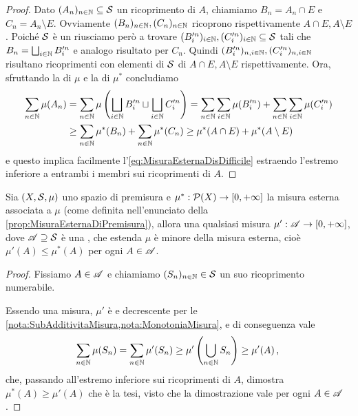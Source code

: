 \begin{proof}
	Dato $(A_n)_{n\in\N}\subseteq\S$ un ricoprimento di $A$, chiamiamo $B_n=A_n\cap E$ e $C_n=A_n\setminus E$. Ovviamente $(B_n)_{n\in\N},(C_n)_{n\in\N}$ ricoprono rispettivamente $A\cap E,A\setminus E$. Poiché $\S$ è un \semiring{} riusciamo però a trovare $(B'^n_i)_{i\in\N},(C'^n_i)_{i\in\N} \subseteq \S$ tali che $B_n=\bigsqcup_{i\in\N}B'^n_i$ e analogo risultato per $C_n$. Quindi $(B'^n_i)_{n,i\in\N}, (C'^n_i)_{n,i\in\N}$ risultano ricoprimenti con elementi di $\S$ di $A\cap E,A\setminus E$ rispettivamente.
	Ora, sfruttando la \sigadd[ità] di $\mu$ e la \sigsubadd[ità] di $\mu^*$ concludiamo
	\begin{align*}
		\sum_{n\in\N}\mu(A_n)&=
		\sum_{n\in\N} \mu\left(\bigsqcup_{i\in\N} B'^n_i\sqcup \bigsqcup_{i\in\N} C'^n_i\right)=
		\sum_{n\in\N}\sum_{i\in\N}\mu(B'^n_i)+\sum_{n\in\N}\sum_{i\in\N}\mu(C'^n_i)\\
		&\ge
		\sum_{n\in\N}\mu^*(B_n)+\sum_{n\in\N}\mu^*(C_n)
		\ge \mu^*(A\cap E)+\mu^*(A\setminus E)
	\end{align*}
	e questo implica facilmente l'\cref{eq:MisuraEsternaDisDifficile} estraendo l'estremo inferiore a entrambi i membri sui ricoprimenti di $A$.
\end{proof}
\begin{remark}\label{nota:PremisuraMassimaMisura}
	Sia $(X,\S,\mu)$ uno spazio di premisura e $\mu^*:\mathcal P(X)\to\Rpiu$ la misura esterna associata a $\mu$ (come definita nell'enunciato della \cref{prop:MisuraEsternaDiPremisura}), allora una qualsiasi misura $\mu':\A\to\Rpiu$, dove $\A\supseteq \S$ è una \sigalg{}, che estenda $\mu$ è minore della misura esterna, cioè $\mu'(A)\le \mu^*(A)$ per ogni $A\in\A$.
\end{remark}
\begin{proof}
	Fissiamo $A\in\A$ e chiamiamo $(S_n)_{n\in\N}\in\S$ un suo ricoprimento numerabile.
	
	Essendo una misura, $\mu'$ è \sigsubadd{} e decrescente per le \cref{nota:SubAdditivitaMisura,nota:MonotoniaMisura}, e di conseguenza vale
	\begin{equation*}
		\sum_{n\in\N}\mu(S_n)=\sum_{n\in\N}\mu'(S_n)\ge \mu'\left(\bigcup_{n\in\N}S_n\right)\ge \mu'(A) \virgola
	\end{equation*}
	che, passando all'estremo inferiore sui ricoprimenti di $A$, dimostra $\mu^*(A)\ge\mu'(A)$ che è la tesi, visto che la dimostrazione vale per ogni $A\in\A$.
\end{proof}



